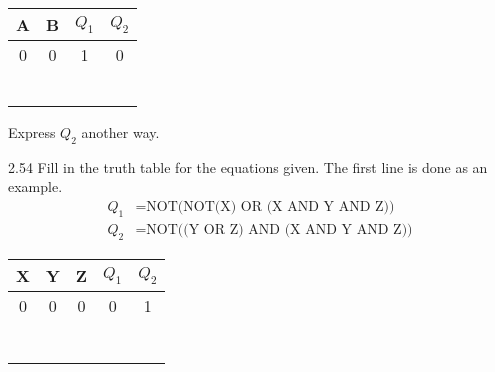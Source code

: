 \documentclass{patt}
\begin{document}
\begin{exercises}
\begin{center}
\fontsize{9}{13}\selectfont
\begin{tabular}{cc|cc}
\hline
\rule{0pt}{10pt}A\rule{0pt}{10pt} & B & $Q_1$ & $Q_2$\\
\hline
\rule{0pt}{10pt}0\rule{0pt}{10pt} & 0 & 1 & 0\\ & & & \\ & & & \\ & &
& \\ & & & \\ & & & \\ & & & \\
\hline
\end{tabular}
\smallskip
\end{center}

Express $Q_2$ another way.

\item[2.54] Fill in the truth table for the equations given.
The first line is done as an example.
\begin{align*}
Q_1 &=\text{NOT(NOT(X) OR (X AND Y AND Z))}\\
Q_2 &=\text{NOT((Y OR Z) AND (X AND Y AND Z))}
\end{align*}

\begin{center}
\fontsize{9}{13}\selectfont
\begin{tabular}{ccc|cc}
\rule{0pt}{10pt}X\rule{0pt}{10pt} & Y & Z & $Q_1$ & $Q_2$\\
\hline
\rule{0pt}{10pt}0\rule{0pt}{10pt} & 0 & 0 & 0 & 1\\ & & & & \\ & & & &
\\ & & & & \\ & & & & \\ & & & & \\ & & & & \\ & & & & \\
\hline
\end{tabular}
\vspace*{1pt}
\end{center}


\end{exercises}
\end{document}
